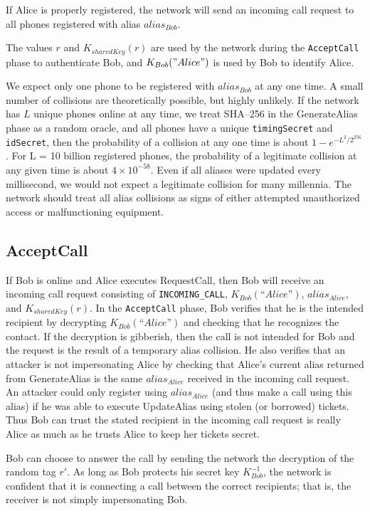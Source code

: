 \documentclass[11pt]{article}
\begin{document}
If Alice is properly registered, the network will send an incoming call request to all phones registered with alias $alias_{Bob}$.

The values $r$ and $K_{sharedKey}(r)$ are used by the network during the \texttt{AcceptCall} phase to authenticate Bob, and $K_{Bob}("Alice")$ is used by Bob to identify Alice. 

We expect only one phone to be registered with $alias_{Bob}$ at any one time. A small number of collisions are theoretically possible, but highly unlikely. If the network has $L$ unique phones online at any time, we treat SHA--256 in the GenerateAlias phase as a random oracle, and all phones have a unique \texttt{timingSecret} and \texttt{idSecret}, then the probability of a collision at any one time is about $1 - e^{-L^2/2^{256}}$. For L = 10 billion registered phones, the probability of a legitimate collision at any given time is about $4 \times 10^{-58}$. Even if all aliases were updated every millisecond, we would not expect a legitimate collision for many millennia. The network should treat all alias collisions as signs of either attempted unauthorized access or malfunctioning equipment.


\subsection{AcceptCall}

If Bob is online and Alice executes RequestCall, then Bob will receive an incoming call request consisting of \texttt{INCOMING_CALL}, $K_{Bob}(“Alice”)$, $alias_{Alice}$, and $K_{sharedKey}(r)$. In the \texttt{AcceptCall} phase, Bob verifies that he is the intended recipient by decrypting $K_{Bob}(“Alice”)$ and checking that he recognizes the contact. If the decryption is gibberish, then the call is not intended for Bob and the request is the result of a temporary alias collision. He also verifies that an attacker is not impersonating Alice by checking that Alice's current alias returned from GenerateAlias is the same $alias_{Alice}$ received in the incoming call request. An attacker could only register using $alias_{Alice}$ (and thus make a call using this alias) if he was able to execute UpdateAlias using stolen (or borrowed) tickets. Thus Bob can trust the stated recipient in the incoming call request is really Alice as much as he trusts Alice to keep her tickets secret. 

Bob can choose to answer the call by sending the network the decryption of the random tag $r'$.  As long as Bob protects his secret key $K^{-1}_{Bob}$, the network is confident that it is connecting a call between the correct recipients; that is, the receiver is not simply impersonating Bob.
\end{document}
